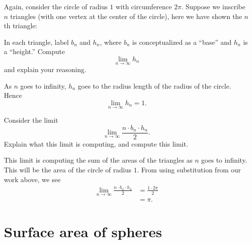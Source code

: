 \documentclass{ximera}
\begin{document}
\begin{problem}
Again, consider the circle of radius $1$ with circumference $2\pi$.
Suppose we inscribe $n$ triangles (with one vertex at the center of
the circle), here we have shown the $n$th triangle:
\begin{image}
\end{image}
In each triangle, label $b_n$ and $h_n$, where $b_n$ is conceptualized
as a ``base'' and $h_n$ is a ``height.'' Compute
\[
\lim_{n\to \infty} h_n
\]
and explain your reasoning.
\begin{freeResponse}
As $n$ goes to infinity, $h_n$ goes to the radius length of the radius
of the circle. Hence
\[
\lim_{n\to \infty} h_n = 1.
\]
\end{freeResponse}
\end{problem}


\begin{problem}
Consider the limit
\[
\lim_{n\to\infty} \frac{n\cdot b_n\cdot h_n}{2}.
\]
Explain what this limit is computing, and compute this limit.
\begin{freeResponse}
This limit is computing the sum of the areas of the triangles as $n$
goes to infinity. This will be the area of the circle of radius
$1$. From using substitution from our work above, we see
\begin{align*}
\lim_{n\to\infty} \frac{n\cdot b_n\cdot h_n}{2} &= \frac{1\cdot 2\pi}{2}\\
&=\pi.
\end{align*}
\end{freeResponse}
\end{problem}


\section{Surface area of spheres}
\end{document}
